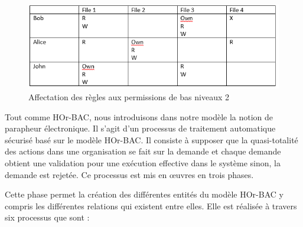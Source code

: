 \begin{figure}[h!]
    \centering
		\includegraphics[scale=0.7]{chap2/images/ACM.png}
    \caption{Affectation des règles aux permissions de bas niveaux 2}
	 \label{figAcm}
\end{figure} 
\label{sectionParapheur}

Tout comme HOr-BAC, nous introduisons dans notre modèle la notion de parapheur électronique. Il s'agit d'un processus de traitement automatique sécurisé basé sur le modèle HOr-BAC. Il consiste à supposer que la quasi-totalité des actions dans une organisation se fait sur la demande et chaque demande obtient une validation pour une exécution effective dans le système sinon, la demande est rejetée. Ce processus est mis en œuvres en trois phases.

\label{sectionPhaseInitialisation}

Cette phase permet la création des différentes entités du modèle HOr-BAC y compris les différentes relations qui existent entre elles. Elle est réalisée à travers six processus que sont :






